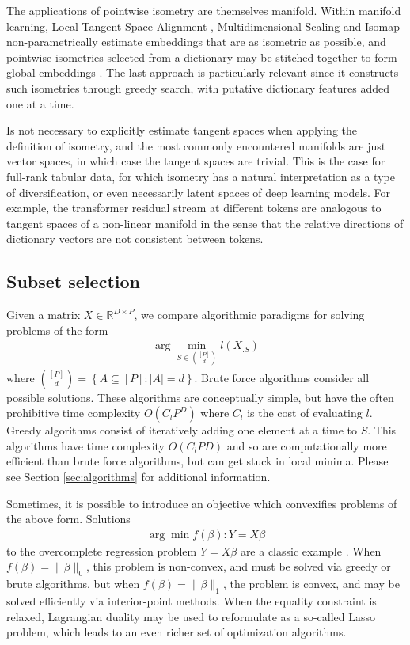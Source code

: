 The applications of pointwise isometry are themselves manifold.
Within manifold learning, Local Tangent Space Alignment \citep{ZhangZ:04}, Multidimensional Scaling \citep{ChenBuja:localMDS09} and Isomap \citep{tenenbaum2000ggf} non-parametrically estimate embeddings that are as isometric as possible, and pointwise isometries selected from a dictionary may be stitched together to form global embeddings \citep{Kohli2021-lr}.
The last approach is particularly relevant since it constructs such isometries through greedy search, with putative dictionary features added one at a time.

Is not necessary to explicitly estimate tangent spaces when applying the definition of isometry, and the most commonly encountered manifolds are just vector spaces, in which case the tangent spaces are trivial.
This is the case for full-rank tabular data, for which isometry has a natural interpretation as a type of diversification, or even necessarily latent spaces of deep learning models.
For example, the transformer residual stream at different tokens are analogous to tangent spaces of a non-linear manifold in the sense that the relative directions of dictionary vectors are not consistent between tokens.

\subsection{Subset selection}

Given a matrix $ X \in \mathbb R^{D \times P}$, we compare algorithmic paradigms for solving problems of the form
\begin{align}
\label{prog:ground_truth}
\arg \min_{ S \in \binom{[P]}{d}} l ( X_{. S})
\end{align}
where $\binom{[P]}{d} = \left\{ A \subseteq [P] : \left|A\right| = d \right\}$.
Brute force algorithms consider all possible solutions.
These algorithms are conceptually simple, but have the often prohibitive time complexity $O(C_lP^D)$ where $C_l$ is the cost of evaluating $l$.
Greedy algorithms consist of iteratively adding one element at a time to $ S$.
This algorithms have time complexity $O(C_lPD)$ and so are computationally more efficient than brute force algorithms, but can get stuck in local minima.
Please see Section \ref{sec:algorithms} for additional information.

Sometimes, it is possible to introduce an objective which convexifies problems of the above form.
Solutions
\begin{align}
\arg \min f(\beta) : Y  = X\beta 
\end{align}
to the overcomplete regression problem $Y = X \beta$ are a classic example \cite{Chen2001-hh}.
When $f(\beta) = \|\beta\|_0$, this problem is non-convex, and must be solved via greedy or brute algorithms, but when $f(\beta) =\|\beta\|_1$, the problem is convex, and may be solved efficiently via interior-point methods.
When the equality constraint is relaxed, Lagrangian duality may be used to reformulate as a so-called Lasso problem, which leads to an even richer set of optimization algorithms. %


